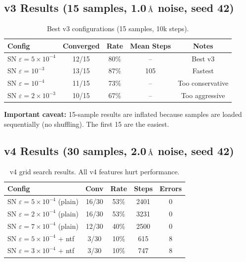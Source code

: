 \documentclass[11pt,a4paper]{article}
\newcommand{\angstrom}{\text{\r{A}}}
\begin{document}
\subsection{v3 Results (15 samples, 1.0\,$\angstrom$ noise, seed 42)}

\begin{table}[H]
\centering
\caption{Best v3 configurations (15 samples, 10k steps).}
\label{tab:v3-results}
\begin{tabular}{lcccc}
\toprule
Config & Converged & Rate & Mean Steps & Notes \\
\midrule
SN $\varepsilon=5\times10^{-4}$ & 12/15 & 80\% & -- & Best v3 \\
SN $\varepsilon=10^{-3}$ & 13/15 & 87\% & 105 & Fastest \\
SN $\varepsilon=10^{-4}$ & 11/15 & 73\% & -- & Too conservative \\
SN $\varepsilon=2\times10^{-3}$ & 10/15 & 67\% & -- & Too aggressive \\
\bottomrule
\end{tabular}
\end{table}

\textbf{Important caveat:} 15-sample results are inflated because samples are loaded sequentially (no shuffling). The first 15 are the easiest.

\subsection{v4 Results (30 samples, 2.0\,$\angstrom$ noise, seed 42)}
\label{sec:v4-results}

\begin{table}[H]
\centering
\caption{v4 grid search results. All v4 features hurt performance.}
\label{tab:v4-results}
\begin{tabular}{lcccc}
\toprule
Config & Conv & Rate & Steps & Errors \\
\midrule
SN $\varepsilon=5\times10^{-4}$ (plain) & 16/30 & 53\% & 2401 & 0 \\
SN $\varepsilon=2\times10^{-4}$ (plain) & 16/30 & 53\% & 3231 & 0 \\
SN $\varepsilon=7\times10^{-4}$ (plain) & 12/30 & 40\% & 2500 & 0 \\
SN $\varepsilon=5\times10^{-4}$ + ntf & 3/30 & 10\% & 615 & 8 \\
SN $\varepsilon=3\times10^{-4}$ + ntf & 3/30 & 10\% & 747 & 8 \\
\bottomrule
\end{tabular}
\end{table}
\end{document}
